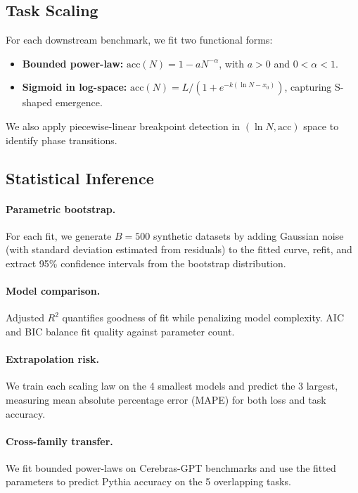 \documentclass[11pt]{article}
\begin{document}
\subsection{Task Scaling}

For each downstream benchmark, we fit two functional forms:
\begin{itemize}
  \item \textbf{Bounded power-law:} $\mathrm{acc}(N) = 1 - a N^{-\alpha}$, with $a > 0$ and $0 < \alpha < 1$.
  \item \textbf{Sigmoid in log-space:} $\mathrm{acc}(N) = L / (1 + e^{-k(\ln N - x_0)})$, capturing S-shaped emergence.
\end{itemize}
We also apply piecewise-linear breakpoint detection in $(\ln N, \mathrm{acc})$ space to identify phase transitions.

\subsection{Statistical Inference}

\paragraph{Parametric bootstrap.}
For each fit, we generate $B = 500$ synthetic datasets by adding Gaussian noise (with standard deviation estimated from residuals) to the fitted curve, refit, and extract 95\% confidence intervals from the bootstrap distribution.

\paragraph{Model comparison.}
Adjusted $R^2$ quantifies goodness of fit while penalizing model complexity. AIC and BIC balance fit quality against parameter count.

\paragraph{Extrapolation risk.}
We train each scaling law on the 4 smallest models and predict the 3 largest, measuring mean absolute percentage error (MAPE) for both loss and task accuracy.

\paragraph{Cross-family transfer.}
We fit bounded power-laws on Cerebras-GPT benchmarks and use the fitted parameters to predict Pythia accuracy on the 5 overlapping tasks.
\end{document}
